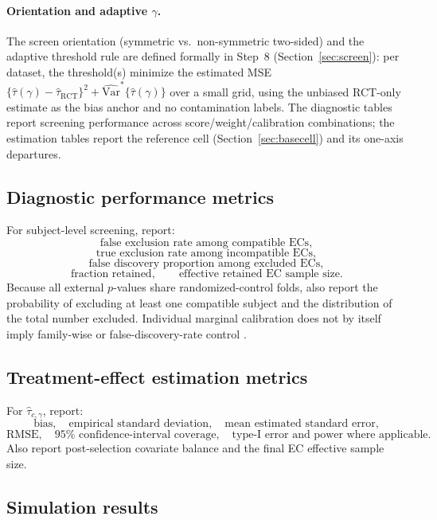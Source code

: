 \documentclass[11pt]{article}
\begin{document}
\paragraph{Orientation and adaptive $\gamma$.}
The screen orientation (symmetric vs.\ non-symmetric two-sided) and the adaptive threshold rule are defined formally in Step~8 (Section~\ref{sec:screen}): per dataset, the threshold(s) minimize the estimated MSE $\{\widehat\tau(\gamma)-\widehat\tau_{\mathrm{RCT}}\}^2+\widehat{\mathrm{Var}}^{\ast}\{\widehat\tau(\gamma)\}$ over a small grid, using the unbiased RCT-only estimate as the bias anchor and no contamination labels. The diagnostic tables report screening performance across score/weight/calibration combinations; the estimation tables report the reference cell (Section~\ref{sec:basecell}) and its one-axis departures.

\subsection{Diagnostic performance metrics}

For subject-level screening, report:
\[
\text{false exclusion rate among compatible ECs},
\]
\[
\text{true exclusion rate among incompatible ECs},
\]
\[
\text{false discovery proportion among excluded ECs},
\]
\[
\text{fraction retained},
\qquad
\text{effective retained EC sample size}.
\]
Because all external $p$-values share randomized-control folds, also report the probability of excluding at least one compatible subject and the distribution of the total number excluded. Individual marginal calibration does not by itself imply family-wise or false-discovery-rate control \citep{bates2023outliers}.

\subsection{Treatment-effect estimation metrics}

For $\widehat\tau_{c,\gamma}$, report:
\[
\text{bias},\quad
\text{empirical standard deviation},\quad
\text{mean estimated standard error},
\]
\[
\text{RMSE},\quad
95\%\text{ confidence-interval coverage},\quad
\text{type-I error and power where applicable}.
\]
Also report post-selection covariate balance and the final EC effective sample size.

\subsection{Simulation results}
\end{document}
